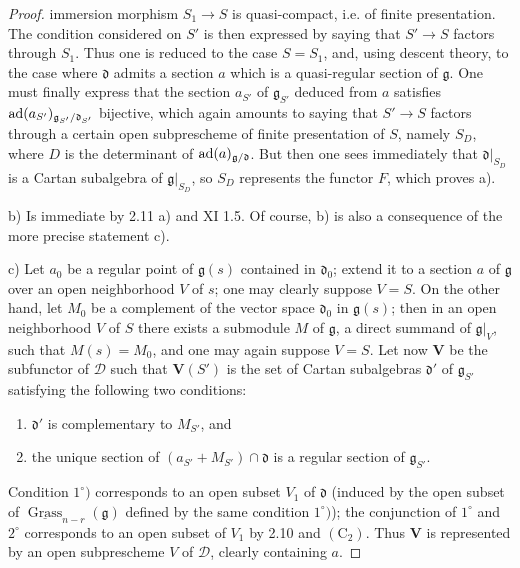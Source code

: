 \begin{proof}
immersion morphism $S_1\to S$ is quasi-compact,
i.e. of finite presentation. The condition considered
on $S'$ is then expressed by saying that $S'\to S$
factors through $S_1$. Thus one is reduced to the
case $S=S_1$, and, using descent theory, to the
case where $\mathfrak d$ admits a section $a$
which is a quasi-regular section of $\mathfrak g$.
One must finally express that the section $a_{S'}$
of $\mathfrak g_{S'}$ deduced from $a$ satisfies
$\operatorname{ad}(a_{S'})_{\mathfrak g_{S'}/\mathfrak d_{S'}}$
bijective, which again amounts to saying that
$S'\to S$ factors through a certain open subprescheme
of finite presentation of $S$, namely $S_D$, where
$D$ is the determinant of $\operatorname{ad}(a)_{\mathfrak g/\mathfrak d}$.
But then one sees immediately that $\mathfrak d|_{S_D}$
is a Cartan subalgebra of $\mathfrak g|_{S_D}$,
so $S_D$ represents the functor $F$, which proves a).

\noindent b) Is immediate by 2.11 a) and XI 1.5.
Of course, b) is also a consequence of the more
precise statement c).

\noindent c) Let $a_0$ be a regular point of
$\mathfrak g(s)$ contained in $\mathfrak d_0$;
extend it to a section $a$ of $\mathfrak g$
over an open neighborhood $V$ of $s$; one may
clearly suppose $V=S$. On the other hand, let
$M_0$ be a complement of the vector space
$\mathfrak d_0$ in $\mathfrak g(s)$; then in
an open neighborhood $V$ of $S$ there exists
a submodule $M$ of $\mathfrak g$, a direct
summand of $\mathfrak g|_V$, such that $M(s)=M_0$,
and one may again suppose $V=S$. Let now $\mathbf V$
be the subfunctor of $\mathscr D$ such that
$\mathbf V(S')$ is the set of Cartan subalgebras
$\mathfrak d'$ of $\mathfrak g_{S'}$ satisfying
the following two conditions:
\begin{enumerate}[label=$\arabic*^\circ)$]
\item $\mathfrak d'$ is complementary to $M_{S'}$, and
\item the unique section of $(a_{S'}+M_{S'})\cap\mathfrak d$
is a regular section of $\mathfrak g_{S'}$.
\end{enumerate}
Condition $1^\circ)$ corresponds to an open subset
$V_1$ of $\mathfrak d$ (induced by the open subset
of $\underline{\operatorname{Grass}}_{n-r}(\mathfrak g)$
defined by the same condition $1^\circ)$); the
conjunction of $1^\circ$ and $2^\circ$ corresponds
to an open subset of $V_1$ by 2.10 and
$(\mathrm C_2)$. Thus $\mathbf V$ is represented
by an open subprescheme $V$ of $\mathscr D$,
clearly containing $a$.


\end{proof}
